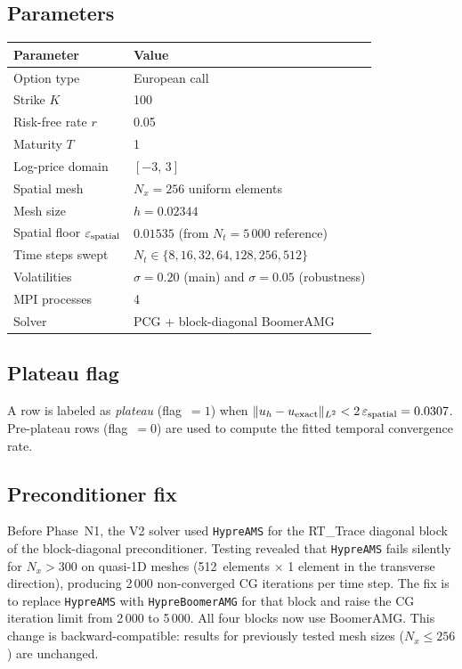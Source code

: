 \documentclass[11pt,a4paper]{article}
\newcommand{\Nx}{N_x}
\newcommand{\Nt}{N_t}
\newcommand{\eps}{\varepsilon}
\begin{document}
\subsection{Parameters}

\begin{center}
\begin{tabular}{ll}
\toprule
Parameter & Value \\
\midrule
Option type         & European call \\
Strike $K$          & 100 \\
Risk-free rate $r$  & 0.05 \\
Maturity $T$        & 1 \\
Log-price domain    & $[-3,\,3]$ \\
Spatial mesh        & $\Nx = 256$ uniform elements \\
Mesh size           & $h = 0.02344$ \\
Spatial floor $\eps_{\rm spatial}$ & $0.01535$ (from $\Nt=5\,000$ reference) \\
Time steps swept    & $\Nt \in \{8,16,32,64,128,256,512\}$ \\
Volatilities        & $\sigma = 0.20$ (main) and $\sigma = 0.05$ (robustness) \\
MPI processes       & 4 \\
Solver              & PCG + block-diagonal BoomerAMG \\
\bottomrule
\end{tabular}
\end{center}

\subsection{Plateau flag}

A row is labeled as \emph{plateau} (flag~$= 1$) when
$\|u_h - u_{\rm exact}\|_{L^2} < 2\,\eps_{\rm spatial} = 0.0307$.
Pre-plateau rows (flag~$= 0$) are used to compute the fitted
temporal convergence rate.

\subsection{Preconditioner fix}\label{sec:solver-fix}

Before Phase~N1, the V2 solver used \texttt{HypreAMS} for the
RT\_Trace diagonal block of the block-diagonal preconditioner.
Testing revealed that \texttt{HypreAMS} fails silently for $\Nx > 300$
on quasi-1D meshes (512~elements$\,\times\,$1 element in the
transverse direction), producing 2\,000 non-converged CG iterations
per time step.  The fix is to replace \texttt{HypreAMS} with
\texttt{HypreBoomerAMG} for that block and raise the CG iteration
limit from 2\,000 to 5\,000.  All four blocks now use BoomerAMG.
This change is backward-compatible: results for previously tested
mesh sizes ($\Nx \le 256$) are unchanged.
\end{document}
